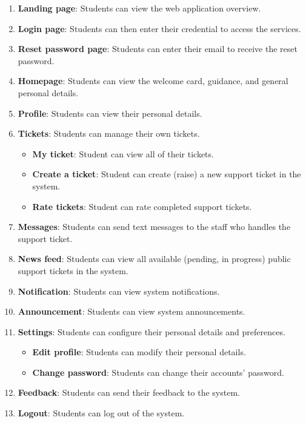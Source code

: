	\begin{enumerate}
		\item \textbf{Landing page}: Students can view the web application overview.
		\item \textbf{Login page}: Students can then enter their credential to access the services.
		\item \textbf{Reset password page}: Students can enter their email to receive the reset password.
		\item \textbf{Homepage}: Students can view the welcome card, guidance, and general personal details.
		\item \textbf{Profile}: Students can view their personal details.
		\item \textbf{Tickets}: Students can manage their own tickets.
			\begin{itemize}
				\item \textbf{My ticket}: Student can view all of their tickets.
				\item \textbf{Create a ticket}: Student can create (raise) a new support ticket in the system.
				\item \textbf{Rate tickets}: Student can rate completed support tickets.
			\end{itemize}
		\item \textbf{Messages}: Students can send text messages to the staff who handles the support ticket.
		\item \textbf{News feed}: Students can view all available (pending, in progress) public support tickets in the system.
		\item \textbf{Notification}: Students can view system notifications.
		\item \textbf{Announcement}: Students can view system announcements.
		\item \textbf{Settings}: Students can configure their personal details and preferences.
			\begin{itemize}
				\item \textbf{Edit profile}: Students can modify their personal details.
				\item \textbf{Change password}: Students can change their accounts' password.
			\end{itemize}
		\item \textbf{Feedback}: Students can send their feedback to the system.
		\item \textbf{Logout}: Students can log out of the system.
	\end{enumerate}
	

